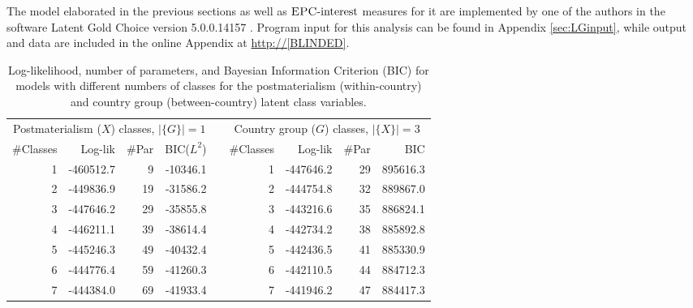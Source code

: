 \documentclass[letterpaper,12pt]{article}
\newcommand{\da}{\textrm{{\sc {EPC}}-interest}}
\begin{document}
The model elaborated in the previous sections as well as $\da{}$ measures for it are implemented by one of the authors in the software Latent Gold Choice version 5.0.0.14157 \citep[pp. 135--136]{vermunt2005lgchoice,vermunt2013technical}. Program input for this analysis can be found in Appendix \ref{sec:LGinput}, while output and data are included in the online Appendix at \url{http://[BLINDED]}.


\begin{table}
\centering
\begin{tabular}{rrrrrrrrr}
  \hline
 \multicolumn{4}{c}{Postmaterialism ($X$) classes, $|\{G\}| = 1$ } &  & \multicolumn{4}{c}{Country group ($G$) classes, $|\{X\}| = 3$} \\ 
\cline{1-4}\cline{6-9}
 \#Classes & Log-lik & \#Par & BIC($L^2$) &  & \#Classes & Log-lik & \#Par & BIC \\ 
  \hline
 1 & -460512.7 & 9 & -10346.1 &  & 1 & -447646.2 & 29 & 895616.3 \\ 
 2 & -449836.9 & 19 & -31586.2 &  & 2 & -444754.8 & 32 & 889867.0 \\ 
 3 & -447646.2 & 29 & -35855.8 &  & 3 & -443216.6 & 35 & 886824.1 \\ 
 4 & -446211.1 & 39 & -38614.4 &  & 4 & -442734.2 & 38 & 885892.8 \\ 
 5 & -445246.3 & 49 & -40432.4 &  & 5 & -442436.5 & 41 & 885330.9 \\ 
 6 & -444776.4 & 59 & -41260.3 &  & 6 & -442110.5 & 44 & 884712.3 \\ 
 7 & -444384.0 & 69 & -41933.4 &  & 7 & -441946.2 & 47 & 884417.3 \\ 
   \hline
\end{tabular}
\caption{Log-likelihood, number of parameters, and Bayesian Information Criterion (BIC) for models with different numbers of classes for the postmaterialism (within-country) and country group (between-country) latent class variables.\label{tab:loglikelihood-models}}
\end{table}
\end{document}

